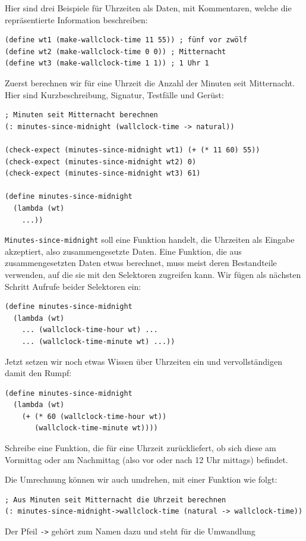 Hier sind drei Beispiele für Uhrzeiten als Daten, mit Kommentaren,
welche die repräsentierte Information beschreiben:
%
\begin{verbatim}
(define wt1 (make-wallclock-time 11 55)) ; fünf vor zwölf
(define wt2 (make-wallclock-time 0 0)) ; Mitternacht
(define wt3 (make-wallclock-time 1 1)) ; 1 Uhr 1
\end{verbatim}
%
Zuerst berechnen wir für eine Uhrzeit die Anzahl der Minuten
seit Mitternacht.  Hier sind Kurzbeschreibung, Signatur, Testfälle und Gerüst:
%
\begin{verbatim}
; Minuten seit Mitternacht berechnen
(: minutes-since-midnight (wallclock-time -> natural))

(check-expect (minutes-since-midnight wt1) (+ (* 11 60) 55))
(check-expect (minutes-since-midnight wt2) 0)
(check-expect (minutes-since-midnight wt3) 61)

(define minutes-since-midnight
  (lambda (wt)
    ...))
\end{verbatim}
%
\texttt{Minutes-since-midnight} soll eine Funktion handelt, die
Uhrzeiten als Eingabe akzeptiert, also zusammengesetzte Daten.  Eine
Funktion, die aus zusammengesetzten Daten etwas berechnet, muss meist
deren Bestandteile verwenden, auf die sie mit den Selektoren zugreifen
kann.  Wir fügen als nächsten Schritt Aufrufe beider Selektoren ein:
%
\begin{verbatim}
(define minutes-since-midnight
  (lambda (wt)
    ... (wallclock-time-hour wt) ...
    ... (wallclock-time-minute wt) ...))
\end{verbatim}
%
Jetzt setzen wir noch etwas Wissen über Uhrzeiten ein und
vervollständigen damit den Rumpf:
%
\begin{verbatim}
(define minutes-since-midnight
  (lambda (wt)
    (+ (* 60 (wallclock-time-hour wt))
       (wallclock-time-minute wt))))
\end{verbatim}
%
\begin{aufgabe}
  Schreibe eine Funktion, die für eine Uhrzeit zurückliefert, ob sich
  diese am Vormittag oder am Nachmittag (also vor oder nach 12 Uhr
  mittags) befindet.
\end{aufgabe}
%
Die Umrechnung können wir auch umdrehen, mit einer Funktion wie folgt:
%
\begin{verbatim}
; Aus Minuten seit Mitternacht die Uhrzeit berechnen
(: minutes-since-midnight->wallclock-time (natural -> wallclock-time))
\end{verbatim}
%
Der Pfeil \verb|->| gehört zum Namen dazu und steht für die Umwandlung
